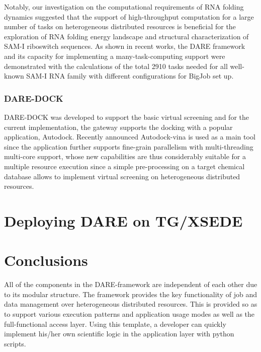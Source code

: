 \documentclass[]{article}
\begin{document}
Notably, our investigation on the computational requirements of RNA
folding dynamics suggested that the support of high-throughput
computation for a large number of tasks on heterogeneous distributed
resources is beneficial for the exploration of RNA folding energy
landscape and structural characterization of SAM-I riboswitch
sequences.  As shown in recent works\cite{ecmls10,ccpe11}, the DARE
framework and its capacity for implementing a many-task-computing
support were demonstrated with the calculations of the total 2910
tasks needed for all well-known SAM-I RNA family with different
configurations for BigJob set up\cite{ecmls10}.


\subsubsection{DARE-DOCK}
DARE-DOCK was developed to support the basic virtual screening and for
the current implementation, the gateway supports the docking with a
popular application, Autodock\cite{autodock}.  Recently announced
Autodock-vina is used as a main tool since the application further
supports fine-grain parallelism with multi-threading multi-core
support, whose new capabilities are thus considerably suitable for a
multiple resource execution since a simple pre-processing on a target
chemical database allows to implement virtual screening on
heterogeneous distributed resources.

%

\section{Deploying DARE on TG/XSEDE}



\section{Conclusions}

All of the components in the DARE-framework are independent of each
other due to its modular structure.  The framework provides the key
functionality of job and data management over heterogeneous
distributed resources. This is provided so as to support various
execution patterns and application usage modes as well as the
full-functional access layer.  Using this template, a developer can
quickly implement his/her own scientific logic in the application
layer with python scripts.
\end{document}
